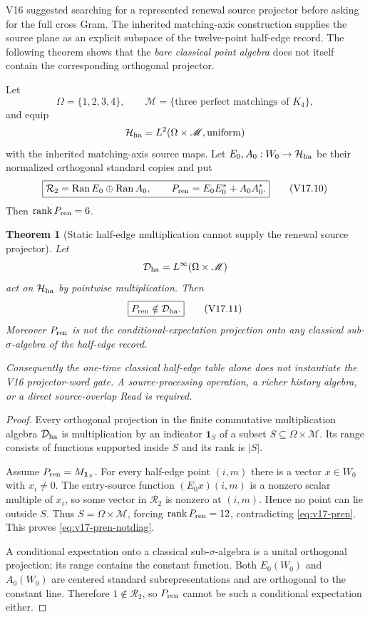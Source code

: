 \documentclass[11pt]{article}
\newtheorem{theorem}{Theorem}[section]
\theoremstyle{definition}
\theoremstyle{remark}
\newcommand{\rank}{\operatorname{rank}}
\newcommand{\one}{\mathbf1}
\begin{document}
V16 suggested searching for a represented renewal source projector before
asking for the full cross Gram.  The inherited matching-axis construction
supplies the source plane as an explicit subspace of the twelve-point half-edge
record.  The following theorem shows that the \emph{bare classical point
algebra} does not itself contain the corresponding orthogonal projector.

Let
\[
 \Omega=\{1,2,3,4\},
 \qquad
 \mathscr M=\{\text{three perfect matchings of }K_4\},
\]
and equip
\[
 \mathcal H_{\rm ha}=L^2(\Omega\times\mathscr M,\text{uniform})
\]
with the inherited matching-axis source maps.  Let $E_0,A_0:W_0\to\mathcal
H_{\rm ha}$ be their normalized orthogonal standard copies and put
\[
 \boxed{
 \mathcal R_2=\operatorname{Ran} E_0\oplus\operatorname{Ran} A_0,
 \qquad
 P_{\rm ren}=E_0E_0^*+A_0A_0^*.}
 \tag{V17.10}\label{eq:v17-pren}
\]
Then $\rank P_{\rm ren}=6$.

\begin{theorem}[Static half-edge multiplication cannot supply the renewal source projector]
\label{thm:v17-halfedge-no-projector}
Let
\[
 \mathcal D_{\rm ha}=L^\infty(\Omega\times\mathscr M)
\]
act on $\mathcal H_{\rm ha}$ by pointwise multiplication.  Then
\[
 \boxed{P_{\rm ren}\notin\mathcal D_{\rm ha}.}
 \tag{V17.11}\label{eq:v17-pren-notdiag}
\]
Moreover $P_{\rm ren}$ is not the conditional-expectation projection onto any
classical sub-$\sigma$-algebra of the half-edge record.

Consequently the one-time classical half-edge table alone does not instantiate
the V16 projector-word gate.  A source-processing operation, a richer history
algebra, or a direct source-overlap Read is required.
\end{theorem}

\begin{proof}
Every orthogonal projection in the finite commutative multiplication algebra
$\mathcal D_{\rm ha}$ is multiplication by an indicator $\one_S$ of a subset
$S\subseteq\Omega\times\mathscr M$.  Its range consists of functions supported
inside $S$ and its rank is $|S|$.

Assume $P_{\rm ren}=M_{\one_S}$.  For every half-edge point $(i,m)$ there is a
vector $x\in W_0$ with $x_i\ne0$.  The entry-source function
$(E_0x)(i,m)$ is a nonzero scalar multiple of $x_i$, so some vector in
$\mathcal R_2$ is nonzero at $(i,m)$.  Hence no point can lie outside $S$.
Thus $S=\Omega\times\mathscr M$, forcing
$\rank P_{\rm ren}=12$, contradicting \eqref{eq:v17-pren}.  This proves
\eqref{eq:v17-pren-notdiag}.

A conditional expectation onto a classical sub-$\sigma$-algebra is a unital
orthogonal projection; its range contains the constant function.  Both
$E_0(W_0)$ and $A_0(W_0)$ are centered standard subrepresentations and are
orthogonal to the constant line.  Therefore
$1\notin\mathcal R_2$, so $P_{\rm ren}$ cannot be such a conditional
expectation either.
\end{proof}
\end{document}
